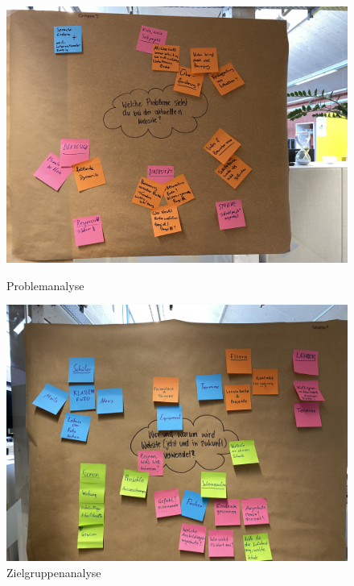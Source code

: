 \begin{figure}
    \begin{minipage}[b]{.4\linewidth} 
       \includegraphics[width=\linewidth]{pics/problemanalyse.jpg}
       \caption{Problemanalyse}
       \label{fig:impl:problemanalyse}
    \end{minipage}
    \hspace{.05\linewidth}
    \begin{minipage}[b]{.4\linewidth}
       \includegraphics[width=\linewidth]{pics/zielgruppenanalyse.jpg}
       \caption{Zielgruppenanalyse}
       \label{fig:impl:zielgruppenanalyse}
    \end{minipage}
 \end{figure}

